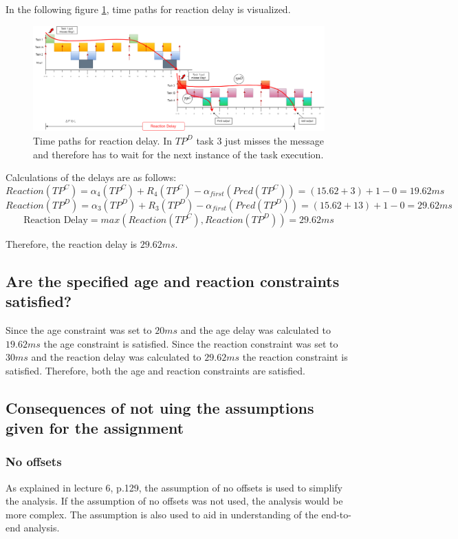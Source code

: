             In the following figure \ref{fig:reactiondelaypaths}, time paths for reaction delay is visualized.

            \begin{figure}[H]
                \centering
                \includegraphics[width=1\textwidth]{images/TimedPathReactionDelay.png}
                \caption{Time paths for reaction delay. In $TP^D$ task 3 just misses the message and therefore has to wait for the next instance of the task execution.}
                \label{fig:reactiondelaypaths} 
            \end{figure}

            Calculations of the delays are as follows: 
            $$Reaction(TP^C) = \alpha_4(TP^C) + R_4(TP^C) - \alpha_{first}(Pred(TP^C)) = (15.62+3) + 1 - 0 = 19.62ms$$
            $$Reaction(TP^D) = \alpha_3(TP^D) + R_3(TP^D) - \alpha_{first}(Pred(TP^D)) = (15.62+13) + 1 - 0 = 29.62ms$$
            $$\text{Reaction Delay} = max(Reaction(TP^C), Reaction(TP^D)) = 29.62ms$$

            Therefore, the reaction delay is $29.62ms$.

        \subsection*{\textbf{Are the specified age and reaction constraints satisfied?}}
            Since the age constraint was set to $20ms$ and the age delay was calculated to $19.62ms$ the age constraint is satisfied. Since the reaction constraint was set to $30ms$ and the reaction delay was calculated to $29.62ms$ the reaction constraint is satisfied. Therefore, both the age and reaction constraints are satisfied.

        \subsection*{\textbf{Consequences of not uing the assumptions given for the assignment}}
            \subsubsection*{No offsets}
                As explained in lecture 6, p.129, the assumption of no offsets is used to simplify the analysis. If the assumption of no offsets was not used, the analysis would be more complex. The assumption is also used to aid in understanding of the end-to-end analysis.

